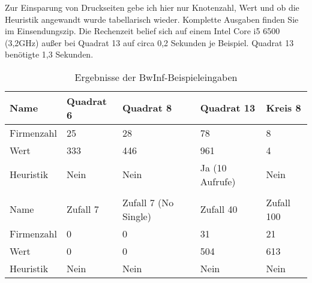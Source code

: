 Zur Einsparung von Druckseiten gebe ich hier nur Knotenzahl, Wert und ob die Heuristik angewandt wurde tabellarisch wieder. Komplette Ausgaben finden Sie im Einsendungszip. Die Rechenzeit belief sich auf einem Intel Core i5 6500 (3,2GHz) außer bei Quadrat 13 auf circa 0,2 Sekunden je Beispiel. Quadrat 13 benötigte 1,3 Sekunden.

\begin{table}[!h]
	\centering
    \begin{tabular}{lllll}
    Name       & Quadrat 6 	& Quadrat 8 				& Quadrat 13      	& Kreis 8		\\ \hline
    Firmenzahl & 25        	& 28        				& 78              	& 8      		\\
    Wert       & 333       	& 446       				& 961             	& 4      		\\
    Heuristik  & Nein      	& Nein      				& Ja (10 Aufrufe) 	& Nein  		\\ \\
    Name       & Zufall 7 	& Zufall 7 (No Single) 		& Zufall 40 		& Zufall 100 	\\ \hline
    Firmenzahl & 0       	& 0                    		& 31        		& 21        	\\
    Wert       & 0        	& 0                    		& 504       		& 613        	\\
    Heuristik  & Nein     	& Nein                 		& Nein      		& Nein      	\\
    \end{tabular}
    \caption{Ergebnisse der BwInf-Beispieleingaben}
\end{table}